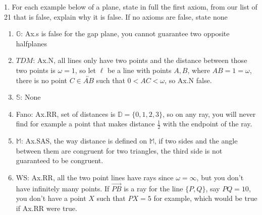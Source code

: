 \documentclass{report}
\begin{document}
    \pagebreak 
    \begin{mdframed}
        1. For each example below of a plane, state in full the first axiom, from our list of 21 that is false, explain why it is false. If no axioms are false, state none 
    \end{mdframed}
    \begin{enumerate}[label=(\alph*)]
        \item \textbf{$\mathbb{G}$}: Ax.s is false for the gap plane, you cannot guarantee two opposite halfplanes
        \item $TDM$: Ax.N, all lines only have two points and the distance between those two points is $ \omega = 1$, so let $\ell$ be a line with points $A,B$, where $AB = 1 = \omega$, there is no point $C \in \overleftrightarrow{AB}$ such that $ 0 < AC < \omega$, so Ax.N false.
        \item $\mathbb{S}$: None
        \item Fano: Ax.RR, set of distances is $\mathbb{D} = \{0,1,2,3\}$, so on any ray, you will never find for example a point that makes distance $\frac{1}{2}$ with the endpoint of the ray.
        \item $\mathbb{M}$: Ax.SAS, the way distance is defined on $\mathbb{M}$, if two sides and the angle between them are congruent for two triangles, the third side is not guaranteed to be congruent.
        \item WS: Ax.RR, all the two point lines have rays since $\omega = \infty$, but you don't have infinitely many points. If $\overrightarrow{PB}$ is a ray for the line $\{P,Q\}$, say $PQ = 10$, you don't have a point $X$ such that $PX = 5$ for example, which would be true if Ax.RR were true.
    \end{enumerate}
\end{document}
